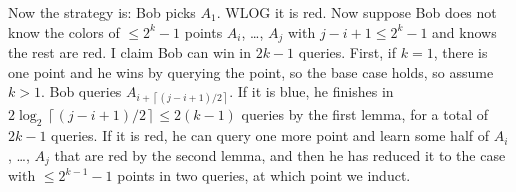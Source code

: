 Now the strategy is: Bob picks $A_1$. WLOG it is red.
Now suppose Bob does not know the colors of $\le 2^k-1$ points
$A_i$, \dots, $A_j$ with $j-i+1\le 2^k-1$ and knows the rest are red.
I claim Bob can win in $2k-1$ queries.
First, if $k=1$, there is one point and he wins by querying the point,
so the base case holds, so assume $k>1$.
Bob queries $A_{i+\left\lceil (j-i+1)/2 \right\rceil}$.
If it is blue, he finishes in $2\log_2{\left\lceil (j-i+1)/2 \right\rceil} \le 2(k-1)$
queries by the first lemma, for a total of $2k-1$ queries.
If it is red, he can query one more point and learn some half
of $A_i$, \dots, $A_j$ that are red by the second lemma,
and then he has reduced it to the case with $\le 2^{k-1}-1$ points
in two queries, at which point we induct.
